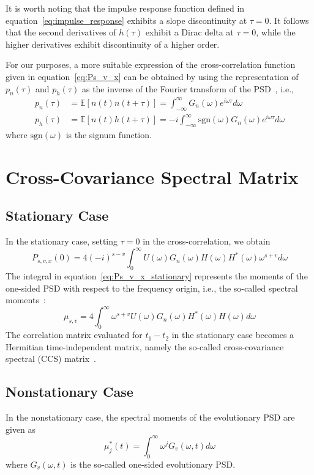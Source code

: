\documentclass[12pt]{article}
\begin{document}
It is worth noting that the impulse response function defined in equation~\eqref{eq:impulse_response} exhibits a slope discontinuity at $\tau = 0$. It follows that the second derivatives of $h(\tau)$ exhibit a Dirac delta at $\tau = 0$, while the higher derivatives exhibit discontinuity of a higher order.

For our purposes, a more suitable expression of the cross-correlation function given in equation~\eqref{eq:Ps_v_x} can be obtained by using the representation of $p_n(\tau)$ and $p_h(\tau)$ as the inverse of the Fourier transform of the PSD~\cite{papoulis1984}, i.e.,
\begin{align}
    p_n(\tau) &= \mathbb{E}[n(t) n(t+\tau)] = \int_{-\infty}^{\infty} G_n(\omega) e^{i\omega\tau} d\omega \label{eq:pn_tau} \\
    p_h(\tau) &= \mathbb{E}[n(t) h(t+\tau)] = -i \int_{-\infty}^{\infty} \text{sgn}(\omega) G_n(\omega) e^{i\omega\tau} d\omega \label{eq:ph_tau}
\end{align}
where $\text{sgn}(\omega)$ is the signum function.

\section{Cross-Covariance Spectral Matrix}

\subsection{Stationary Case}
In the stationary case, setting $\tau = 0$ in the cross-correlation, we obtain
\begin{equation}
    P_{s,v,x}(0) = 4(-i)^{s-v} \int_0^{\infty} U(\omega) G_n(\omega) H(\omega) H^*(\omega) \omega^{s+v} d\omega
    \label{eq:Ps_v_x_stationary}
\end{equation}
The integral in equation~\eqref{eq:Ps_v_x_stationary} represents the moments of the one-sided PSD with respect to the frequency origin, i.e., the so-called spectral moments~\cite{vanmarcke1972}:
\begin{equation}
    \mu_{s,v} = 4 \int_0^{\infty} \omega^{s+v} U(\omega) G_n(\omega) H^*(\omega) H(\omega) d\omega
    \label{eq:spectral_moments}
\end{equation}
The correlation matrix evaluated for $t_1 - t_2$ in the stationary case becomes a Hermitian time-independent matrix, namely the so-called cross-covariance spectral (CCS) matrix~\cite{borino1988}.

\subsection{Nonstationary Case}
In the nonstationary case, the spectral moments of the evolutionary PSD are given as
\begin{equation}
    \mu_j^*(t) = \int_0^{\infty} \omega^j G_v(\omega, t) d\omega
    \label{eq:nonstationary_spec_moments}
\end{equation}
where $G_v(\omega, t)$ is the so-called one-sided evolutionary PSD.
\end{document}

